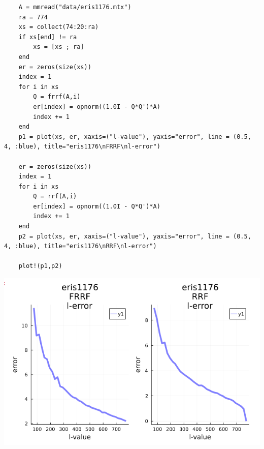 \documentclass[11pt,a4paper]{article}
\theoremstyle{definition}
\begin{document}
	\begin{lstlisting}
	A = mmread("data/eris1176.mtx")
	ra = 774
	xs = collect(74:20:ra)
	if xs[end] != ra
	    xs = [xs ; ra]
	end
	er = zeros(size(xs))
	index = 1
	for i in xs 
	    Q = frrf(A,i)
	    er[index] = opnorm((1.0I - Q*Q')*A)
	    index += 1
	end
	p1 = plot(xs, er, xaxis=("l-value"), yaxis="error", line = (0.5, 4, :blue), title="eris1176\nFRRF\nl-error")
	
	er = zeros(size(xs))
	index = 1
	for i in xs 
	    Q = rrf(A,i)
	    er[index] = opnorm((1.0I - Q*Q')*A)
	    index += 1
	end
	p2 = plot(xs, er, xaxis=("l-value"), yaxis="error", line = (0.5, 4, :blue), title="eris1176\nRRF\nl-error")
	
	plot!(p1,p2)
	\end{lstlisting}
	\includegraphics[scale=0.5]{images/4.5_3.png}
\end{document}
